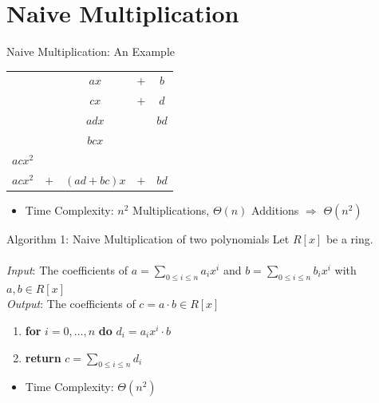 \documentclass[12pt]{beamer}
\begin{document}
\section{Naive Multiplication}

\begin{frame}{Naive Multiplication: An Example}
\begin{center}
{\Huge
\begin{tabular}{ccccc}
        &   &      $ax$  & $+$ & $b$  \\
        &   &     $cx$   & $+$ & $d$  \\
\hline
        &   &    $adx$   &     & $bd$ \\
        &   &    $bcx$   &     &      \\
$acx^2$ &   &            &     &      \\
\hline
$acx^2$ &$+$& $(ad+bc)x$ & $+$ & $bd$
\end{tabular}
}
\end{center}
\pause
\begin{itemize}
\item Time Complexity: $n^2$ Multiplications, $\Theta(n)$ Additions $\Rightarrow$ $\Theta(n^2)$
\end{itemize}
\end{frame}

\begin{frame}{}
\begin{block}{Algorithm 1: Naive Multiplication of two polynomials}
Let $R[x]$ be a ring.
\\~\\
\emph{Input}: The coefficients of $a = \sum_{0 \leq i \leq n} a_i x^i$ and $b = \sum_{0 \leq i \leq n} b_i x^i$
with $a,b \in R[x]$\\
\emph{Output}: The coefficients of $c = a \cdot b \in R[x]$
\begin{enumerate}
\item \textbf{for} $i = 0,\dots, n$ \textbf{do} $d_i = a_i x^i \cdot b$
\item \textbf{return} $c = \sum_{0 \leq i \leq n} d_i$
\end{enumerate}
\end{block}
\begin{itemize}
\item Time Complexity: $\Theta(n^2)$
\end{itemize}
\end{frame}
\end{document}
